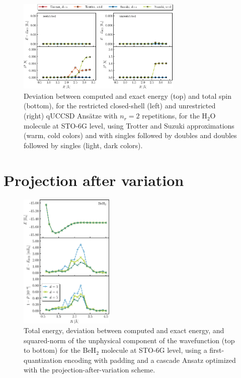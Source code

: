 \documentclass[aps,pra,twocolumn]{revtex4-2}
\begin{document}
\begin{figure}[t!]
\includegraphics[width=0.7\textwidth]{../figures/qUCCSD_flavors/quccsd_reps_2.eps}
\caption{Deviation between computed and exact energy (top) and total spin (bottom), for the restricted closed-shell (left) and unrestricted (right) qUCCSD Ans\"{a}tze with $n_r=2$ repetitions, for the H$_2$O molecule at STO-6G level, using Trotter and Suzuki approximations (warm, cold colors) and with singles followed by doubles and doubles followed by singles (light, dark colors).}
\label{figure:quccsd_reps_2}
\end{figure} 

\section{Projection after variation}
\label{sec:pav}

\begin{figure}[t!]
\includegraphics[width=0.4\textwidth]{../figures/first_quantization_pad_pav/first_quantization_pad_pav.eps}
\caption{Total energy, deviation between computed and exact energy, and squared-norm of the unphysical component of the wavefunction
(top to bottom) for the BeH$_2$ molecule at STO-6G level, 
using a first-quantization encoding with padding and a cascade Ansatz optimized with the projection-after-variation scheme.}
\label{figure:pad_pav}
\end{figure} 



\end{document}
